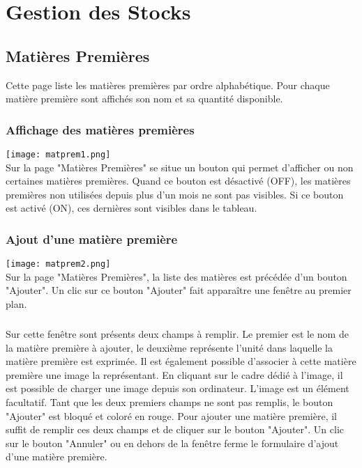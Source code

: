 \chapter{Gestion des Stocks}

\section{Matières Premières}
Cette page liste les matières premières par ordre alphabétique. Pour chaque
matière première sont affichés son nom et sa quantité disponible.

\subsection{Affichage des matières premières}

\texttt{[image: matprem1.png]}\\

Sur la page "Matières Premières" se situe un bouton qui permet d'afficher ou non
certaines matières premières. Quand ce bouton est désactivé (OFF), les matières
premières non utilisées depuis plus d'un mois ne sont pas visibles. Si ce bouton
 est activé (ON), ces dernières sont visibles dans le tableau.


\subsection{Ajout d'une matière première}
\texttt{[image: matprem2.png]}\\
Sur la page "Matières Premières", la liste des matières est précédée d'un bouton
 "Ajouter".
Un clic sur ce bouton "Ajouter" fait apparaître une fenêtre au premier plan.

\paragraph{}
Sur cette fenêtre sont présents deux champs à remplir. Le premier est le nom de
la matière première à ajouter, le deuxième représente l'unité dans laquelle la
matière première est exprimée. Il est également possible d'associer à cette
matière première une image la représentant. En cliquant sur le cadre dédié à
l'image, il est possible de charger une image depuis son ordinateur. L'image est
un élément facultatif. Tant que les deux premiers champs ne sont pas remplis,
le bouton "Ajouter" est bloqué et coloré en rouge. Pour ajouter une matière
première, il suffit de remplir ces deux champs et de cliquer sur le bouton
"Ajouter". Un clic sur le bouton "Annuler" ou en dehors de la fenêtre ferme
le formulaire d'ajout d'une matière première.


